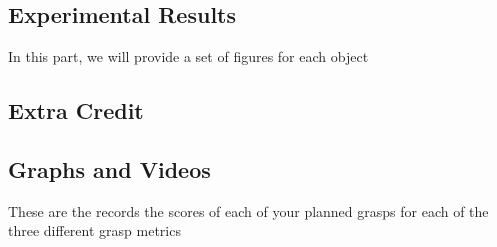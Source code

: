 \documentclass{article}
\begin{document}
\begin{multicols}{2}
\section{Experimental Results}
In this part, we will provide a set of figures for each object

\subsection{Extra Credit}


\subsection{Graphs and Videos}
These are the records the scores of each of your planned grasps for each of the three different grasp
metrics



\end{multicols}
\end{document}
